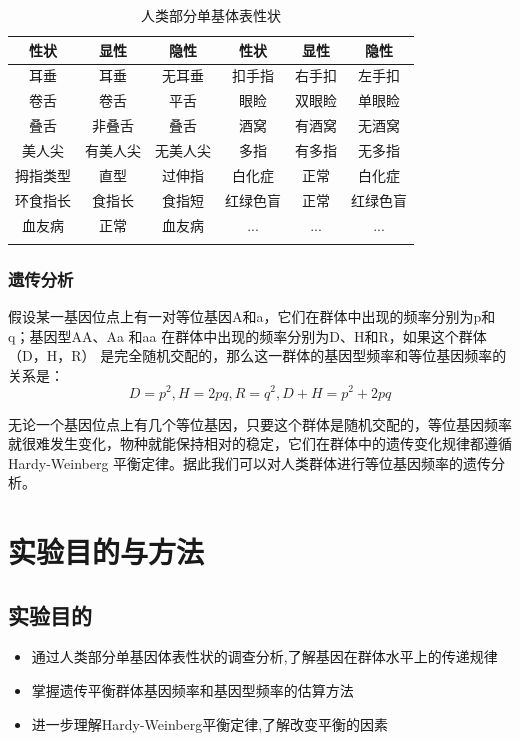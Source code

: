 \documentclass[AutoFakeBold]{LZUThesis}
\begin{document}
\begin{enumerate}
\begin{longtable}{ccc|ccc}
    \toprule
    性状     & 显性   & 隐性  &  性状   & 显性   & 隐性  \\
    \midrule
    耳垂     & 耳垂   & 无耳垂  & 扣手指    & 右手扣  & 左手扣  \\
    卷舌     & 卷舌   & 平舌   & 眼睑     & 双眼睑  & 单眼睑  \\
    叠舌     & 非叠舌  & 叠舌   & 酒窝     & 有酒窝  & 无酒窝  \\
    美人尖    & 有美人尖 & 无美人尖 & 多指     & 有多指  & 无多指  \\
    拇指类型   & 直型   & 过伸指  & 白化症    & 正常   & 白化症  \\
    环食指长 & 食指长  & 食指短  & 红绿色盲   & 正常   & 红绿色盲 \\
    血友病   & 正常   & 血友病  & ...   & ...   & ...  \\
    \bottomrule
    \caption{人类部分单基体表性状}
\end{longtable}

\subsection{遗传分析}
假设某一基因位点上有一对等位基因A和a，它们在群体中出现的频率分别为p和q；基因型AA、Aa 和aa
在群体中出现的频率分别为D、H和R，如果这个群体（D，H，R） 是完全随机交配的，那么这一群体的基因型频率和等位基因频率的关系是：
$$D=p^2, H=2pq, R=q^2, D+H=p^2+2pq$$

无论一个基因位点上有几个等位基因，只要这个群体是随机交配的，等位基因频率就很难发生变化，物种就能保持相对的稳定，它们在群体中的遗传变化规律都遵循
Hardy-Weinberg 平衡定律。据此我们可以对人类群体进行等位基因频率的遗传分析。

\chapter{实验目的与方法}
\section{实验目的}
\begin{itemize}
    \item 通过人类部分单基因体表性状的调查分析,了解基因在群体水平上的传递规律\par
    \item 掌握遗传平衡群体基因频率和基因型频率的估算方法\par
    \item 进一步理解Hardy-Weinberg平衡定律,了解改变平衡的因素\par
\end{itemize}


\end{enumerate}
\end{document}
